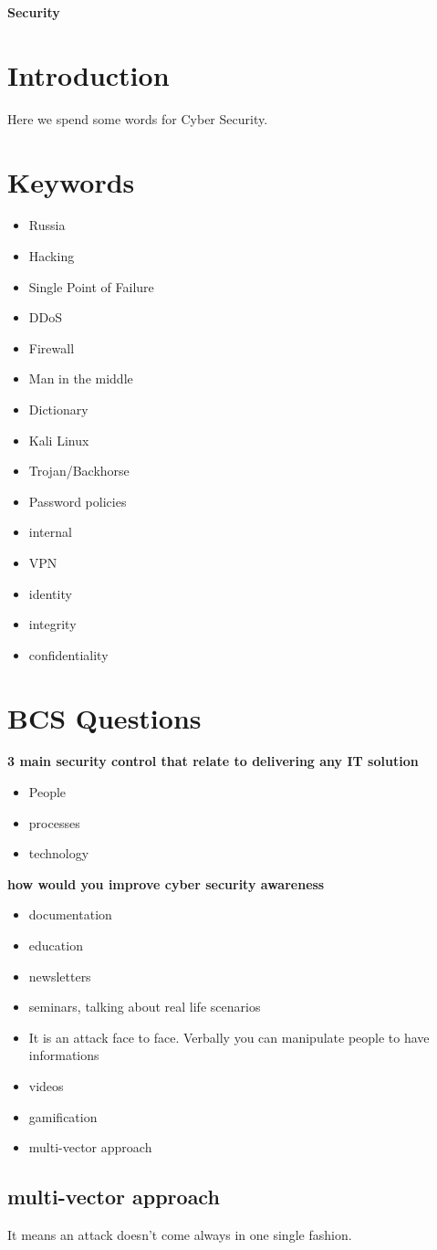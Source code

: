 \documentclass[a4paper,12pt]{article}
\begin{document}
\textbf{Security}


\tableofcontents
\clearpage

 
\section{Introduction}
Here we spend some words for Cyber Security.
\section{Keywords}

\begin{itemize}
\item Russia
\item Hacking
\item Single Point of Failure
\item DDoS
\item Firewall
\item Man in the middle
\item Dictionary
\item Kali Linux
\item Trojan/Backhorse
\item Password policies
\item internal
\item VPN
\item identity 
\item integrity
\item confidentiality
\end{itemize}

\section{BCS Questions}

\textbf {3 main security control that relate to delivering any IT solution}
\begin{itemize}
\item People
\item processes
\item technology 
\end{itemize}


\textbf {how would you improve cyber security awareness}
\begin{itemize}
\item documentation
\item education
\item newsletters
\item seminars, talking about real life scenarios
\item {}
It is an attack face to face. Verbally you can manipulate people to have informations
\item videos
\item gamification
\item multi-vector approach
\end{itemize}

\subsection{multi-vector approach}
It means an attack doesn't come always in one single fashion. 


\clearpage

\printindex
\end{document}
